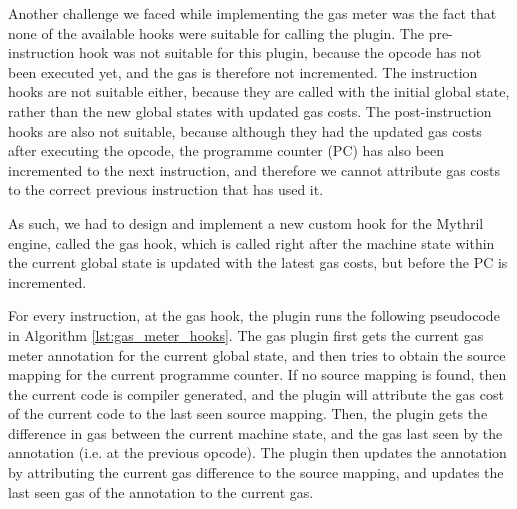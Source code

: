 Another challenge we faced while implementing the gas meter 
was the fact that none of the available hooks were suitable 
for calling the plugin. The pre-instruction hook was not suitable
for this plugin, because the opcode has not been executed yet, and the gas is therefore not 
incremented. The instruction hooks are not suitable either, because they are called with the
initial global state, rather than the new global states with updated gas costs. The post-instruction
hooks are also not suitable, because although they had the updated gas costs after executing the
opcode, the programme counter (PC) has also been incremented to the next instruction, and therefore
we cannot attribute gas costs to the correct previous instruction that has used it. 

As such, 
we had to design and implement a new custom hook for the Mythril engine, called the gas hook, 
which is called right after the machine state within the current
global state is updated with the latest gas costs, but before the PC is 
incremented.

For every instruction, at the gas hook, 
the plugin runs the following pseudocode in Algorithm \ref{lst:gas_meter_hooks}. 
The gas plugin first gets the current gas meter annotation for the current global state,
and then tries to obtain the source mapping for the current programme counter. If no source
mapping is found, then the current code is compiler generated, and the plugin will
attribute the gas cost of the current code to the last seen source mapping. Then, 
the plugin gets the difference in gas between the current machine state, and the gas last
seen by the annotation (i.e. at the previous opcode). The plugin then updates the annotation
by attributing the current gas difference to the source mapping, and updates the last seen
gas of the annotation to the current gas.



